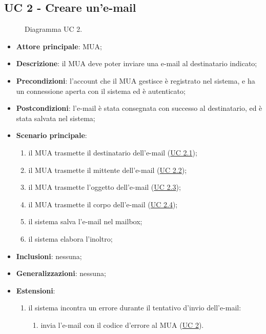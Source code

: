 
\subsection{UC 2 - Creare un'e-mail} \label{sec:UC2}
    \begin{figure}[h]
        \centering
        \caption{Diagramma UC 2.}
    \end{figure}
    \begin{itemize}
        \item \textbf{Attore principale}: MUA;
        \item \textbf{Descrizione}: il MUA deve poter inviare una e-mail al destinatario indicato;
        \item \textbf{Precondizioni}: l’account che il MUA gestisce è registrato nel sistema, e ha un connessione aperta con il sistema ed è autenticato;
        \item \textbf{Postcondizioni}: l'e-mail è stata consegnata con successo al destinatario, ed è stata salvata nel sistema;
        \item \textbf{Scenario principale}:
            \begin{enumerate}
                \item il MUA trasmette il destinatario dell'e-mail (\hyperref[sec:UC2.1]{UC 2.1});
                \item il MUA trasmette il mittente dell'e-mail (\hyperref[sec:UC2.2]{UC 2.2});
                \item il MUA trasmette l'oggetto dell'e-mail (\hyperref[sec:UC2.3]{UC 2.3});
                \item il MUA trasmette il corpo dell'e-mail (\hyperref[sec:UC2.4]{UC 2.4});
                \item il sistema salva l'e-mail nel mailbox;
                \item il sistema elabora l'inoltro;
            \end{enumerate}
        \item \textbf{Inclusioni}: nessuna;
        \item \textbf{Generalizzazioni}: nessuna;
        \item \textbf{Estensioni}: 
            \begin{enumerate}[label=\alph*.]
                \item il sistema incontra un errore durante il tentativo d'invio dell'e-mail:
                \begin{enumerate}[label=\arabic*.]
                    \item invia l'e-mail con il codice d'errore al MUA (\hyperref[sec:UC2]{UC 2}).
                \end{enumerate}
            \end{enumerate}
    \end{itemize}

